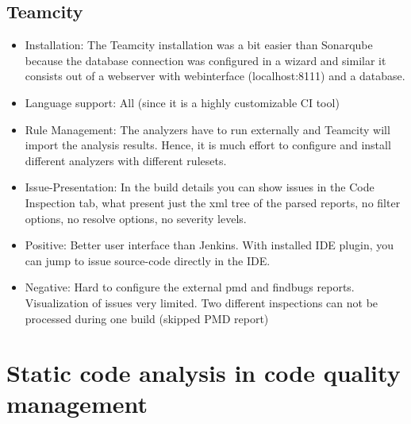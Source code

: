 \documentclass[conference]{IEEEtran}
\begin{document}
\subsection{Teamcity}
\label{subsec:static_code_analysis_teamcity}
\begin{itemize}
	\item Installation: The Teamcity installation was a bit easier than Sonarqube because the database connection was configured in a wizard and similar it consists out of a webserver with webinterface (localhost:8111) and a database.
	
	\item Language support: All (since it is a highly customizable CI tool)
	
	\item Rule Management: The analyzers have to run externally and Teamcity will import the analysis results.
	Hence, it is much effort to configure and install different analyzers with different rulesets.
	
	\item Issue-Presentation: In the build details you can show issues in the Code Inspection tab, what present just the xml tree of the parsed reports, no filter options, no resolve options, no severity levels.
	
	\item Positive: Better user interface than Jenkins. With installed IDE plugin, you can jump to issue source-code directly in the IDE. 
	
	\item Negative: Hard to configure the external pmd and findbugs reports. Visualization of issues very limited. Two different inspections can not be processed during one build (skipped PMD report)
	
\end{itemize}





\section{Static code analysis in code quality management}
\label{sec:static_code_analysis_code_quality_management}
\end{document}
